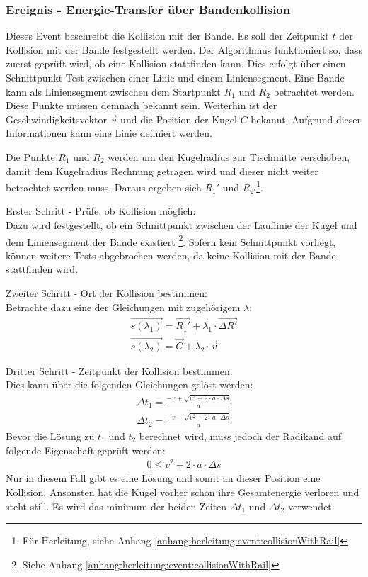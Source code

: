 \subsubsection{Ereignis - Energie-Transfer über Bandenkollision}
Dieses Event beschreibt die Kollision mit der Bande. Es soll der Zeitpunkt $t$ der Kollision mit der Bande festgestellt werden.
Der Algorithmus funktioniert so, dass zuerst geprüft wird, ob eine Kollision stattfinden kann.
Dies erfolgt über einen Schnittpunkt-Test zwischen einer Linie und einem Liniensegment.
Eine Bande kann als Liniensegment zwischen dem Startpunkt $R_1$ und $R_2$ betrachtet werden. Diese Punkte müssen demnach bekannt sein.
Weiterhin ist der Geschwindigkeitsvektor $\vec{v}$ und die Position der Kugel $C$ bekannt.
Aufgrund dieser Informationen kann eine Linie definiert werden.

Die Punkte $R_1$ und $R_2$ werden um den Kugelradius zur Tischmitte verschoben,
damit dem Kugelradius Rechnung getragen wird und dieser nicht weiter betrachtet werden muss.
Daraus ergeben sich $R_1'$ und $R_{2'}$\footnote{Für Herleitung, siehe Anhang \ref{anhang:herleitung:event:collisionWithRail}}.

Erster Schritt - Prüfe, ob Kollision möglich:\\
Dazu wird festgestellt, ob ein Schnittpunkt zwischen der Lauflinie der Kugel und dem Liniensegment der
Bande existiert \footnote{Siehe Anhang \ref{anhang:herleitung:event:collisionWithRail}}.
Sofern kein Schnittpunkt vorliegt, können weitere Tests abgebrochen werden, da keine Kollision mit der Bande stattfinden wird.

Zweiter Schritt - Ort der Kollision bestimmen:\\
Betrachte dazu eine der Gleichungen mit zugehörigem $\lambda$:
\begin{align}
    \vec{s(\lambda_1)} = \vec{R_1'} + \lambda_1 \cdot \vec{\Delta R'}\\
    \vec{s(\lambda_2)} = \vec{C} + \lambda_2 \cdot \vec{v}
\end{align}

Dritter Schritt - Zeitpunkt der Kollision bestimmen:\\
Dies kann über die folgenden Gleichungen gelöst werden:
\begin{align}
    \Delta t_1 = \frac{-v + \sqrt{v^2 + 2 \cdot a \cdot \Delta s}}{a}\\
    \Delta t_2 = \frac{-v - \sqrt{v^2 + 2 \cdot a \cdot \Delta s}}{a}
\end{align}
Bevor die Lösung zu $t_1$ und $t_2$ berechnet wird, muss jedoch der Radikand auf folgende Eigenschaft geprüft werden:
\begin{align}
    0 \leq v^2 + 2 \cdot a \cdot \Delta s
\end{align}
Nur in diesem Fall gibt es eine Lösung und somit an dieser Position eine Kollision. Ansonsten hat die Kugel vorher schon
ihre Gesamtenergie verloren und steht still. Es wird das minimum der beiden Zeiten $\Delta t_1$ und $\Delta t_2$ verwendet.

